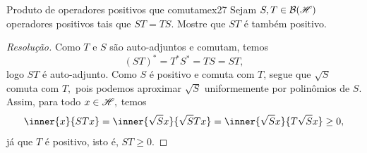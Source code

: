 \begin{exercício}{Produto de operadores positivos que comutam}{ex27}
    Sejam \(S, T \in \mathcal{B}(\mathscr{H})\) operadores positivos tais que \(ST = TS.\) Mostre que \(ST\) é também positivo.
\end{exercício}
\begin{proof}[Resolução]
  Como \(T\) e \(S\) são auto-adjuntos e comutam, temos
  \begin{equation*}
    (ST)^* = T^*S^* = TS = ST,
  \end{equation*}
  logo \(ST\) é auto-adjunto. Como \(S\) é positivo e comuta com \(T\), segue que \(\sqrt{S}\) comuta com \(T,\) pois podemos aproximar \(\sqrt{S}\) uniformemente por polinômios de \(S.\) Assim, para todo \(x \in \mathscr{H},\) temos
  \begin{equation*}
    \inner{x}{STx} = \inner{\sqrt{S}x}{\sqrt{S}Tx} = \inner{\sqrt{S}x}{T\sqrt{S}x} \geq 0,
  \end{equation*}
  já que \(T\) é positivo, isto é, \(ST \geq 0.\)
\end{proof}
